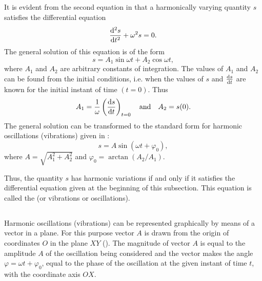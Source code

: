 \subsection{}\label{28.1.5} It is evident from the second equation in  that a harmonically varying quantity $s$ satisfies the differential equation
\begin{equation*}%
\dv[2]{s}{t} + \omega^{2} s= 0.
\end{equation*}
The general solution of this equation is of the form 
\begin{equation*}%
s = A_{1} \sin \omega t + A_{2} \cos \omega t,
\end{equation*}
where $A_{1}$ and $A_{2}$ are arbitrary constants of integration. The values of $A_{1}$ and $A_{2}$ can be found from the initial conditions, i.e. when the values of $s$ and $\dv{s}{t}$ are known for the initial instant of time $(t = 0)$. Thus
\begin{equation*}%
A_{1} = \frac{1}{\omega} \left( \dv{s}{t}\right)_{t=0} \qand A_{2} = s(0).
\end{equation*}
The general solution can be transformed to the standard form for harmonic oscillations (vibrations) given in :
\begin{equation*}%
s = A \sin  (\omega t + \varphi_{0}),
\end{equation*}
where $A= \sqrt{A_{1}^{2} + A_{2}^{2}}$ and $\varphi_{0} = \arctan(A_{2}/A_{1})$.

Thus, the quantity $s$ has harmonic variations if and only if it satisfies the differential equation given at the beginning of this subsection. This equation is called the  (or vibrations or oscillations).



\subsection{}\label{28.1.6} Harmonic oscillations (vibrations) can be represented graphically by means of a vector in a plane. For this purpose vector $A$ is drawn from the origin of coordinates $O$ in the plane $XY$ (). The magnitude of vector $A$ is equal to the amplitude $A$ of the oscillation being considered and the vector makes the angle $\varphi = \omega t + \varphi_{0}$, equal to the phase of the oscillation at the given instant of time $t$, with the coordinate axis $OX$. 


